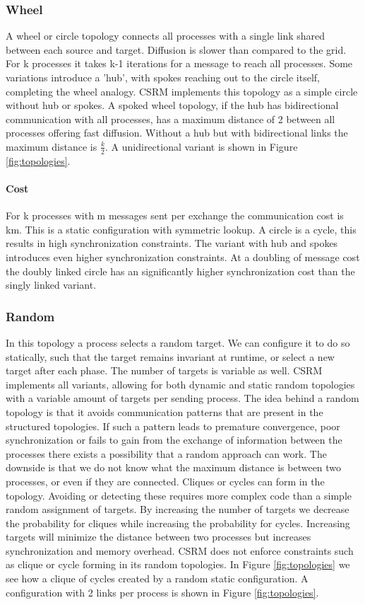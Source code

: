 \subsubsection{Wheel}
A wheel or circle topology connects all processes with a single link shared between each source and target. Diffusion is slower than compared to the grid. For k processes it takes k-1 iterations for a message to reach all processes. Some variations introduce a 'hub', with spokes reaching out to the circle itself, completing the wheel analogy. CSRM implements this topology as a simple circle without hub or spokes. A spoked wheel topology, if the hub has bidirectional communication with all processes, has a maximum distance of 2 between all processes offering fast diffusion. Without a hub but with bidirectional links the maximum distance is $\frac{k}{2}$. A unidirectional variant is shown in Figure \ref{fig:topologies}.

\paragraph{Cost}
For k processes with m messages sent per exchange the communication cost is km. This is a static configuration with symmetric lookup. A circle is a cycle, this results in high synchronization constraints. The variant with hub and spokes introduces even higher synchronization constraints. At a doubling of message cost the doubly linked circle has an significantly higher synchronization cost than the singly linked variant. 

\subsubsection{Random}
In this topology a process selects a random target. We can configure it to do so statically, such that the target remains invariant at runtime, or select a new target after each phase. The number of targets is variable as well. CSRM implements all variants, allowing for both dynamic and static random topologies with a variable amount of targets per sending process. 
The idea behind a random topology is that it avoids communication patterns that are present in the structured topologies. If such a pattern leads to premature convergence, poor synchronization or fails to gain from the exchange of information between the processes there exists a possibility that a random approach can work. The downside is that we do not know what the maximum distance is between two processes, or even if they are connected. Cliques or cycles can form in the topology. Avoiding or detecting these requires more complex code than a simple random assignment of targets. By increasing the number of targets we decrease the probability for cliques while increasing the probability for cycles. Increasing targets will minimize the distance between two processes but increases synchronization and memory overhead.
CSRM does not enforce constraints such as clique or cycle forming in its random topologies. In Figure \ref{fig:topologies} we see how a clique of cycles created by a random static configuration. A configuration with 2 links per process is shown in Figure \ref{fig:topologies}.

